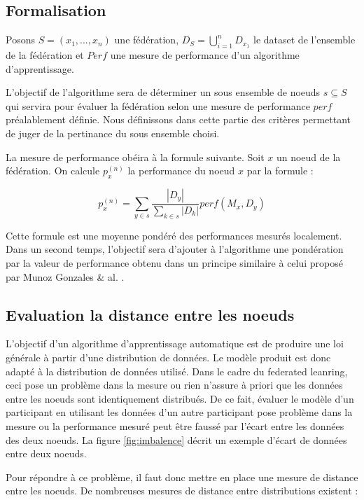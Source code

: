 \documentclass[stage3a]{tnreport} %
\begin{document}
\subsection{Formalisation}

Posons $S=(x_1,...,x_n)$ une fédération, $D_S = \bigcup_{i=1}^n D_{x_1}$ le dataset de l'ensemble de la fédération et $Perf$ une mesure de performance d'un algorithme d'apprentissage. 

L'objectif de l'algorithme sera de déterminer un sous ensemble de noeuds $s \subseteq S$ qui servira pour évaluer la fédération selon une mesure de performance $perf$ préalablement définie. Nous définissons dans cette partie des critères permettant de juger de la pertinance du sous ensemble choisi.

La mesure de performance obéira à la formule suivante. Soit $x$ un noeud de la fédération. On calcule $p_x^{(n)}$ la performance du noeud $x$ par la formule :

\begin{equation}
  p_x^{(n)} = \sum_{y\in s} \frac{|D_y|}{\sum_{k\in s} |D_k|} perf(M_x,D_y)
\end{equation}

Cette formule est une moyenne pondéré des performances mesurés localement. Dans un second temps, l'objectif sera d'ajouter à l'algorithme une pondération par la valeur de performance obtenu dans un principe similaire à celui proposé par Munoz Gonzales \& al. .

\subsection{Evaluation la distance entre les noeuds}

L'objectif d'un algorithme d'apprentissage automatique est de produire une loi générale à partir d'une distribution de données. Le modèle produit est donc adapté à la distribution de données utilisé. Dans le cadre du federated leanring, ceci pose un problème dans la mesure ou rien n'assure à priori que les données entre les noeuds sont identiquement distribués. De ce fait, évaluer le modèle d'un participant en utilisant les données d'un autre participant pose problème dans la mesure ou la performance mesuré peut être faussé par l'écart entre les données des deux noeuds. La figure \ref{fig:imbalence} décrit un exemple d'écart de données entre deux noeuds.

Pour répondre à ce problème, il faut donc mettre en place une mesure de distance entre les noeuds. De nombreuses mesures de distance entre distributions existent :
\end{document}
